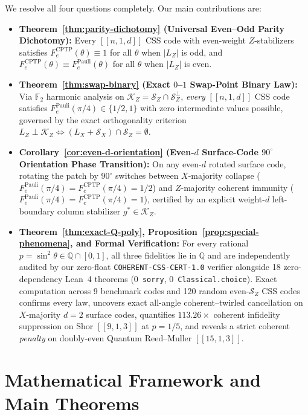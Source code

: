 \documentclass[11pt,a4paper]{article}
\theoremstyle{plain}
\theoremstyle{definition}
\newcommand{\Ftwo}{\mathbb{F}_2}
\newcommand{\Q}{\mathbb{Q}}
\newcommand{\SZ}{\mathcal{S}_Z}
\newcommand{\SX}{\mathcal{S}_X}
\newcommand{\KZ}{\mathcal{K}_Z}
\begin{document}
We resolve all four questions completely. Our main contributions are:
\begin{itemize}[leftmargin=1.5em,itemsep=2pt]
  \item \textbf{Theorem~\ref{thm:parity-dichotomy} (Universal Even--Odd Parity Dichotomy):} Every $[[n,1,d]]$ CSS code with even-weight $Z$-stabilizers satisfies $F_e^{\mathrm{CPTP}}(\theta) \equiv 1$ for all $\theta$ when $|L_Z|$ is odd, and $F_e^{\mathrm{CPTP}}(\theta) \equiv F_e^{\mathrm{Pauli}}(\theta)$ for all $\theta$ when $|L_Z|$ is even.
  \item \textbf{Theorem~\ref{thm:swap-binary} (Exact $0$--$1$ Swap-Point Binary Law):} Via $\Ftwo$ harmonic analysis on $\KZ = \SZ \cap \SZ^\perp$, \emph{every} $[[n,1,d]]$ CSS code satisfies $F_e^{\mathrm{Pauli}}(\pi/4) \in \{1/2, 1\}$ with zero intermediate values possible, governed by the exact orthogonality criterion $L_Z \perp \KZ \iff (L_X + \SX) \cap \SZ = \emptyset$.
  \item \textbf{Corollary~\ref{cor:even-d-orientation} (Even-$d$ Surface-Code $90^\circ$ Orientation Phase Transition):} On any even-$d$ rotated surface code, rotating the patch by $90^\circ$ switches between $X$-majority collapse ($F_e^{\mathrm{Pauli}}(\pi/4) = F_e^{\mathrm{CPTP}}(\pi/4) = 1/2$) and $Z$-majority coherent immunity ($F_e^{\mathrm{Pauli}}(\pi/4) = F_e^{\mathrm{CPTP}}(\pi/4) = 1$), certified by an explicit weight-$d$ left-boundary column stabilizer $g^* \in \KZ$.
  \item \textbf{Theorem~\ref{thm:exact-Q-poly}, Proposition~\ref{prop:special-phenomena}, and Formal Verification:} For every rational $p = \sin^2\theta \in \Q \cap [0,1]$, all three fidelities lie in $\Q$ and are independently audited by our zero-float \texttt{COHERENT-CSS-CERT-1.0} verifier alongside 18 zero-dependency Lean~4 theorems (0~\texttt{sorry}, 0~\texttt{Classical.choice}). Exact computation across 9 benchmark codes and 120 random even-$\SZ$ CSS codes confirms every law, uncovers exact all-angle coherent--twirled cancellation on $X$-majority $d=2$ surface codes, quantifies $113.26\times$ coherent infidelity suppression on Shor $[[9,1,3]]$ at $p=1/5$, and reveals a strict coherent \emph{penalty} on doubly-even Quantum Reed--Muller $[[15,1,3]]$.
\end{itemize}

\section{Mathematical Framework and Main Theorems}
\end{document}
